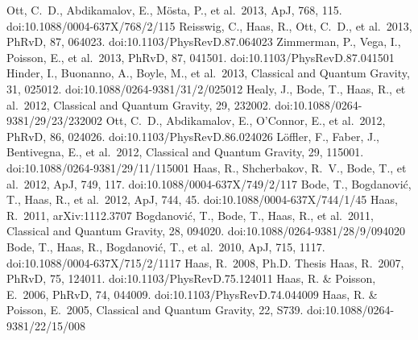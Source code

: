 \documentclass[11pt,a4paper,roman]{moderncv}        %
\newcommand\apj{\textrm{ApJ}}%
\newcommand\prd{\textrm{PhRvD}}%
\begin{document}
\begin{thebibliography}{99}
 Ott, C.~D., Abdikamalov, E., M{\"o}sta, P., et al.\ 2013, \apj, 768, 115. doi:10.1088/0004-637X/768/2/115
 Reisswig, C., Haas, R., Ott, C.~D., et al.\ 2013, \prd, 87, 064023. doi:10.1103/PhysRevD.87.064023
 Zimmerman, P., Vega, I., Poisson, E., et al.\ 2013, \prd, 87, 041501. doi:10.1103/PhysRevD.87.041501
 Hinder, I., Buonanno, A., Boyle, M., et al.\ 2013, Classical and Quantum Gravity, 31, 025012. doi:10.1088/0264-9381/31/2/025012
 Healy, J., Bode, T., Haas, R., et al.\ 2012, Classical and Quantum Gravity, 29, 232002. doi:10.1088/0264-9381/29/23/232002
 Ott, C.~D., Abdikamalov, E., O'Connor, E., et al.\ 2012, \prd, 86, 024026. doi:10.1103/PhysRevD.86.024026
 L{\"o}ffler, F., Faber, J., Bentivegna, E., et al.\ 2012, Classical and Quantum Gravity, 29, 115001. doi:10.1088/0264-9381/29/11/115001
 Haas, R., Shcherbakov, R.~V., Bode, T., et al.\ 2012, \apj, 749, 117. doi:10.1088/0004-637X/749/2/117
 Bode, T., Bogdanovi{\'c}, T., Haas, R., et al.\ 2012, \apj, 744, 45. doi:10.1088/0004-637X/744/1/45
 Haas, R.\ 2011, arXiv:1112.3707
 Bogdanovi{\'c}, T., Bode, T., Haas, R., et al.\ 2011, Classical and Quantum Gravity, 28, 094020. doi:10.1088/0264-9381/28/9/094020
 Bode, T., Haas, R., Bogdanovi{\'c}, T., et al.\ 2010, \apj, 715, 1117. doi:10.1088/0004-637X/715/2/1117
 Haas, R.\ 2008, Ph.D. Thesis
 Haas, R.\ 2007, \prd, 75, 124011. doi:10.1103/PhysRevD.75.124011
 Haas, R. \& Poisson, E.\ 2006, \prd, 74, 044009. doi:10.1103/PhysRevD.74.044009
 Haas, R. \& Poisson, E.\ 2005, Classical and Quantum Gravity, 22, S739. doi:10.1088/0264-9381/22/15/008
\end{thebibliography}
\end{document}
